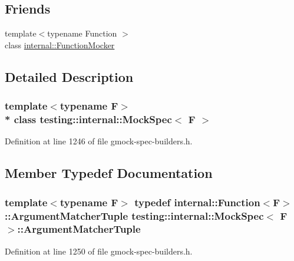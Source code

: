 \subsection*{Friends}
\begin{DoxyCompactItemize}
\item 
{\footnotesize template$<$typename Function $>$ }\\class \hyperlink{classtesting_1_1internal_1_1_mock_spec_a6980863fff8693124aff79c507f87d45}{internal\+::\+Function\+Mocker}
\end{DoxyCompactItemize}


\subsection{Detailed Description}
\subsubsection*{template$<$typename F$>$\\*
class testing\+::internal\+::\+Mock\+Spec$<$ F $>$}



Definition at line 1246 of file gmock-\/spec-\/builders.\+h.



\subsection{Member Typedef Documentation}
\subsubsection[{\texorpdfstring{Argument\+Matcher\+Tuple}{ArgumentMatcherTuple}}]{\setlength{\rightskip}{0pt plus 5cm}template$<$typename F$>$ typedef {\bf internal\+::\+Function}$<$F$>$\+::{\bf Argument\+Matcher\+Tuple} {\bf testing\+::internal\+::\+Mock\+Spec}$<$ F $>$\+::{\bf Argument\+Matcher\+Tuple}}\hypertarget{classtesting_1_1internal_1_1_mock_spec_a35dc5836483cb8c6882c365c447b26cd}{}\label{classtesting_1_1internal_1_1_mock_spec_a35dc5836483cb8c6882c365c447b26cd}


Definition at line 1250 of file gmock-\/spec-\/builders.\+h.

